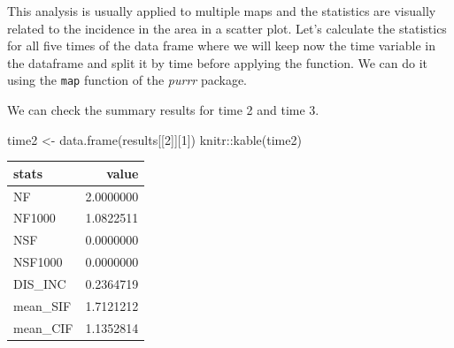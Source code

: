 \documentclass[
  letterpaper,
]{book}
\newenvironment{Shaded}{\begin{snugshade}}{\end{snugshade}}
\newcommand{\CommentTok}[1]{\textcolor[rgb]{0.37,0.37,0.37}{#1}}
\newcommand{\DecValTok}[1]{\textcolor[rgb]{0.68,0.00,0.00}{#1}}
\newcommand{\FunctionTok}[1]{\textcolor[rgb]{0.28,0.35,0.67}{#1}}
\newcommand{\NormalTok}[1]{\textcolor[rgb]{0.00,0.23,0.31}{#1}}
\newcommand{\OtherTok}[1]{\textcolor[rgb]{0.00,0.23,0.31}{#1}}
\newcommand{\SpecialCharTok}[1]{\textcolor[rgb]{0.37,0.37,0.37}{#1}}
\begin{document}
This analysis is usually applied to multiple maps and the statistics are
visually related to the incidence in the area in a scatter plot. Let's
calculate the statistics for all five times of the data frame where we
will keep now the time variable in the dataframe and split it by time
before applying the function. We can do it using the \texttt{map}
function of the \emph{purrr} package.

\begin{Shaded}
\end{Shaded}

We can check the summary results for time 2 and time 3.

\begin{Shaded}
\begin{Highlighting}[]
\NormalTok{time2 }\OtherTok{\textless{}{-}} \FunctionTok{data.frame}\NormalTok{(results[[}\DecValTok{2}\NormalTok{]][}\DecValTok{1}\NormalTok{])}
\NormalTok{knitr}\SpecialCharTok{::}\FunctionTok{kable}\NormalTok{(time2)}
\end{Highlighting}
\end{Shaded}

\begin{longtable}[]{@{}lr@{}}
\toprule\noalign{}
stats & value \\
\midrule\noalign{}
\endhead
\bottomrule\noalign{}
\endlastfoot
NF & 2.0000000 \\
NF1000 & 1.0822511 \\
NSF & 0.0000000 \\
NSF1000 & 0.0000000 \\
DIS\_INC & 0.2364719 \\
mean\_SIF & 1.7121212 \\
mean\_CIF & 1.1352814 \\
\end{longtable}
\end{document}
